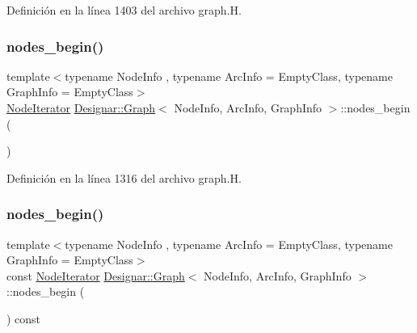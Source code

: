 Definición en la línea 1403 del archivo graph.\+H.

\mbox{\label{class_designar_1_1_graph_a4f492f9b89d1d647e53171d7bb4d4acd}} 
\subsubsection{\texorpdfstring{nodes\+\_\+begin()}{nodes\_begin()}\hspace{0.1cm}{\footnotesize\ttfamily [1/2]}}
{\footnotesize\ttfamily template$<$typename Node\+Info , typename Arc\+Info  = Empty\+Class, typename Graph\+Info  = Empty\+Class$>$ \\
\hyperlink{class_designar_1_1_graph_1_1_node_iterator}{Node\+Iterator} \hyperlink{class_designar_1_1_graph}{Designar\+::\+Graph}$<$ Node\+Info, Arc\+Info, Graph\+Info $>$\+::nodes\+\_\+begin (\begin{DoxyParamCaption}{ }\end{DoxyParamCaption})\hspace{0.3cm}{\ttfamily [inline]}}



Definición en la línea 1316 del archivo graph.\+H.

\mbox{\label{class_designar_1_1_graph_acd4d942eba98e1eb138b9566f1d9bb75}} 
\subsubsection{\texorpdfstring{nodes\+\_\+begin()}{nodes\_begin()}\hspace{0.1cm}{\footnotesize\ttfamily [2/2]}}
{\footnotesize\ttfamily template$<$typename Node\+Info , typename Arc\+Info  = Empty\+Class, typename Graph\+Info  = Empty\+Class$>$ \\
const \hyperlink{class_designar_1_1_graph_1_1_node_iterator}{Node\+Iterator} \hyperlink{class_designar_1_1_graph}{Designar\+::\+Graph}$<$ Node\+Info, Arc\+Info, Graph\+Info $>$\+::nodes\+\_\+begin (\begin{DoxyParamCaption}{ }\end{DoxyParamCaption}) const\hspace{0.3cm}{\ttfamily [inline]}}



